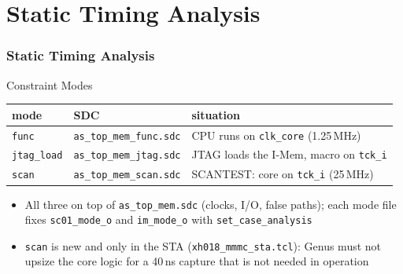 \documentclass{beamer}
\newcommand{\astitle}{nix}
\newcommand{\assubtitle}{nix}
\newcommand{\cmd}[1]{\texttt{#1}}
\begin{document}
\section{Static Timing Analysis}
\renewcommand{\astitle}{Static Timing Analysis}

\renewcommand{\assubtitle}{Constraint Modes}
\begin{frame}
\frametitle{\astitle}
\begin{block}{\assubtitle}
  \footnotesize
  \begin{tabularx}{\linewidth}{@{}llY@{}}
    \textbf{mode} & \textbf{SDC} & \textbf{situation}\\\hline
    \cmd{func}      & \cmd{as\_top\_mem\_func.sdc} & CPU runs on \cmd{clk\_core} (1.25\,MHz)\\
    \cmd{jtag\_load} & \cmd{as\_top\_mem\_jtag.sdc} & JTAG loads the I-Mem, macro on \cmd{tck\_i}\\
    \cmd{scan}      & \cmd{as\_top\_mem\_scan.sdc} & SCANTEST: core on \cmd{tck\_i} (25\,MHz)\\
  \end{tabularx}
  \vspace{4pt}
  \begin{itemize}
    \item All three on top of \cmd{as\_top\_mem.sdc} (clocks, I/O, false
      paths); each mode file fixes \cmd{sc01\_mode\_o} and
      \cmd{im\_mode\_o} with \cmd{set\_case\_analysis}
    \item \cmd{scan} is new and only in the STA
      (\cmd{xh018\_mmmc\_sta.tcl}): Genus must not upsize the core logic
      for a 40\,ns capture that is not needed in operation
  \end{itemize}
\end{block}
\end{frame}
\end{document}
